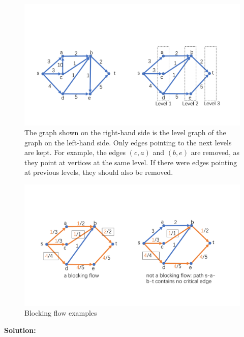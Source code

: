 \documentclass{oxmathproblems}
\begin{document}
\begin{questions}
\begin{figure}[H]
    \centering
    \includegraphics[width=\textwidth]{levelgraph.pdf}
    \caption{The graph shown on the right-hand side is the level graph of the graph on the left-hand side. Only edges pointing to the next levels are kept. For example, the edges $(c,a)$ and $(b,e)$ are removed, as they point at vertices at the same level. If there were edges pointing at previous levels, they should also be removed.}
    \label{fig:levelgraph}
\end{figure}

\begin{figure}[H]
    \centering
    \includegraphics[width=\textwidth]{blockingflow.pdf}
    \caption{Blocking flow examples}
    \label{fig:blockingflow}
\end{figure}

\textbf{Solution:}

\begin{parts}

\end{parts}
\end{questions}
\end{document}
